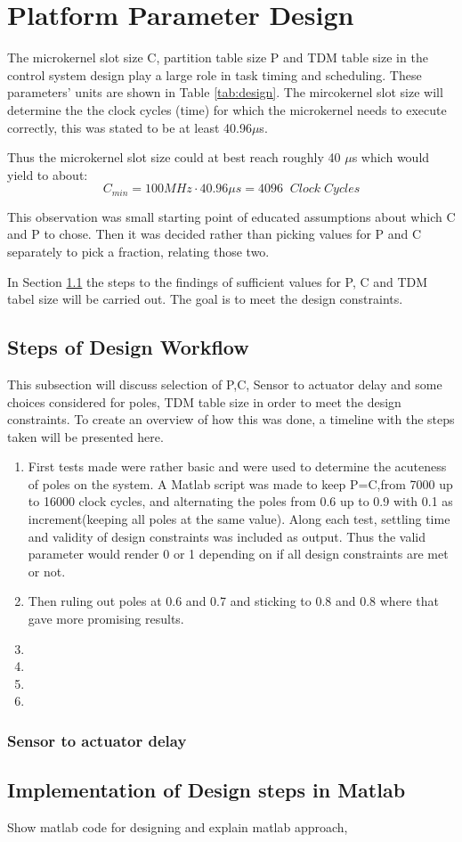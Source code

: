 \section{Platform Parameter Design}
\label{sec:platform}

The microkernel slot size C, partition table size P and TDM table size in the control system design play a large role in task timing and scheduling. These parameters' units are shown in Table \ref{tab:design}. The mircokernel slot size will determine the the clock cycles (time) for which the microkernel needs to execute correctly, this was stated to be at least 40.96$\mu$s.

Thus the microkernel slot size could at best reach roughly 40 $\mu$s which would yield to about: $$ C_{min} = 100MHz \cdot 40.96 \mu s = 4096 \;\;Clock \; Cycles$$

This observation was small starting point of educated assumptions about which C and P to chose. Then it was decided rather than picking values for P and C separately to pick a fraction, relating those two. 

In Section \ref{sec:steps} the steps to the findings of sufficient values for P, C and TDM tabel size will be carried out. The goal is to meet the design constraints.

\subsection{Steps of Design Workflow}
\label{sec:steps}
This subsection will discuss selection of P,C, Sensor to actuator delay and some choices considered for poles, TDM table size in order to meet the design constraints. To create an overview of how this was done, a timeline with the steps taken will be presented here.

\begin{enumerate}
	\item First tests made were rather basic and were used to determine the acuteness of poles on the system. A Matlab script was made to keep P=C,from 7000 up to 16000 clock cycles, and alternating the poles from 0.6 up to 0.9 with 0.1 as increment(keeping all poles at the same value). Along each test, settling time and validity of design constraints was included as output. Thus the valid parameter would render 0 or 1 depending on if all design constraints are met or not. 
	\item Then ruling out poles at 0.6 and 0.7 and sticking to 0.8 and 0.8 where that gave more promising results.
	\item
	\item
	\item
	\item
\end{enumerate}

\subsubsection{Sensor to actuator delay}
\label{sec:stad}

\subsection{Implementation of Design steps in Matlab}
\color{red}
Show matlab code for designing and explain matlab approach,
\color{black}